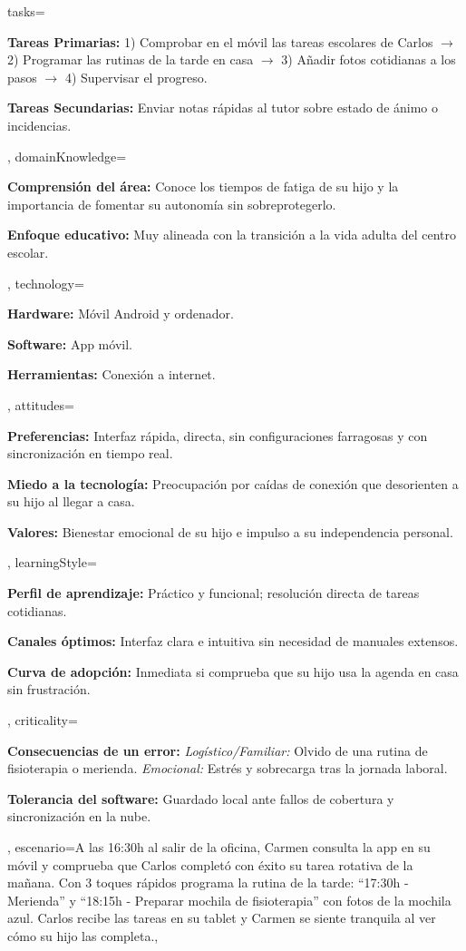\documentclass[10pt]{article}
\begin{document}
    tasks={%
        \item \textbf{Tareas Primarias:} 
        1) Comprobar en el móvil las tareas escolares de Carlos $\rightarrow$ 2) Programar las rutinas de la tarde en casa $\rightarrow$ 3) Añadir fotos cotidianas a los pasos $\rightarrow$ 4) Supervisar el progreso.
        \item \textbf{Tareas Secundarias:} Enviar notas rápidas al tutor sobre estado de ánimo o incidencias.
    },
    domainKnowledge={%
        \item \textbf{Comprensión del área:} Conoce los tiempos de fatiga de su hijo y la importancia de fomentar su autonomía sin sobreprotegerlo.
        \item \textbf{Enfoque educativo:} Muy alineada con la transición a la vida adulta del centro escolar.
    },
    technology={%
        \item \textbf{Hardware:} Móvil Android y ordenador.
        \item \textbf{Software:} App móvil.
        \item \textbf{Herramientas:} Conexión a internet.
    },
    attitudes={%
        \item \textbf{Preferencias:} Interfaz rápida, directa, sin configuraciones farragosas y con sincronización en tiempo real.
        \item \textbf{Miedo a la tecnología:} Preocupación por caídas de conexión que desorienten a su hijo al llegar a casa.
        \item \textbf{Valores:} Bienestar emocional de su hijo e impulso a su independencia personal.
    },
    learningStyle={%
        \item \textbf{Perfil de aprendizaje:} Práctico y funcional; resolución directa de tareas cotidianas.
        \item \textbf{Canales óptimos:} Interfaz clara e intuitiva sin necesidad de manuales extensos.
        \item \textbf{Curva de adopción:} Inmediata si comprueba que su hijo usa la agenda en casa sin frustración.
    },
    criticality={%
        \item \textbf{Consecuencias de un error:} \textit{Logístico/Familiar:} Olvido de una rutina de fisioterapia o merienda. \textit{Emocional:} Estrés y sobrecarga tras la jornada laboral.
        \item \textbf{Tolerancia del software:} Guardado local ante fallos de cobertura y sincronización en la nube.
    },
    escenario={A las 16:30h al salir de la oficina, Carmen consulta la app en su móvil y comprueba que Carlos completó con éxito su tarea rotativa de la mañana. Con 3 toques rápidos programa la rutina de la tarde: ``17:30h - Merienda'' y ``18:15h - Preparar mochila de fisioterapia'' con fotos de la mochila azul. Carlos recibe las tareas en su tablet y Carmen se siente tranquila al ver cómo su hijo las completa.},
\end{document}
